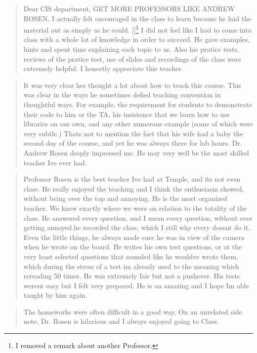 \documentclass[]{article}
\begin{document}
\begin{small}
\begin{quotation}
	Dear CIS department, GET MORE PROFESSORS LIKE ANDREW ROSEN. I actually felt encouraged in the class to learn because he laid the material out as simply as he could. [\textellipsis]\footnote{I removed a remark about another Professor.} I did not feel like I had to come into class with a whole lot of knowledge in order to succeed. He gave examples, hints and spent time explaining each topic to us.  Also his pratice tests, reviews of the pratice test, use of slides and recordings of the class were extremely helpful. I honestly appreciate this teacher.
	
\end{quotation}

\begin{quotation}
	It was very clear hes thought a lot about how to teach this course. This was clear in the ways he sometimes defied teaching convention in thoughtful ways. For example, the requirement for students to demonstrate their code to him or the TA, his insistence that we learn how to use libraries on our own, and any other numerous example (some of which were very subtle.) Thats not to mention the fact that his wife had a baby the second day of the course, and yet he was always there for lab hours. Dr. Andrew Rosen deeply impressed me. He may very well be the most skilled teacher Ive ever had.
	
\end{quotation}

\begin{quotation}
	Professor Rosen is the best teacher Ive had at Temple, and its not even close. He really enjoyed the teaching and I think the enthusiasm showed, without being over the top and annoying. He is the most organized teacher. We knew exactly where we were on relation to the totality of the class. He answered every question, and I mean every question, without ever getting annoyed.he recorded the class, which I still why every doesnt do it. Even the little things, he always made sure he was in view of the camera when he wrote on the board. He writes his own test questions, or at the very least selected questions that sounded like he wouldve wrote them, which during the stress of a test im already used to the meaning which rereading 50 times. He was extremely fair but not a pushover. His tests werent easy but I felt very prepared. He is an amazing and I hope Im able taught by him again.
	
\end{quotation}

\begin{quotation}
	The homeworks were often difficult in a good way. On an unrelated side note, Dr. Rosen is hilarious and I always enjoyed going to Class.
\end{quotation}

\end{small}
\end{document}
